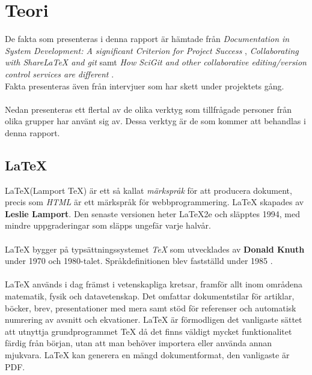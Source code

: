 \section{Teori}
\label{cha:wassing-theory}
De fakta som presenteras i denna rapport är hämtade från \textit{Documentation in System Development: A significant Criterion for Project Success} \cite{docsystemdev}, \textit{Collaborating with ShareLaTeX and git} \cite{website:sharelatex_with_git} samt \textit{How SciGit and other collaborative editing/version control services are different} \cite{website:scigit_blog}. \\
Fakta presenteras även från intervjuer som har skett under projektets gång.
\\ \\
Nedan presenteras ett flertal av de olika verktyg som tillfrågade personer från olika grupper har använt sig av. Dessa verktyg är de som kommer att behandlas i denna rapport.

\subsection{LaTeX}
\LaTeX (Lamport TeX) är ett så kallat \textit{märkspråk} för att producera dokument, precis som \textit{HTML} är ett märkspråk för webbprogrammering. LaTeX skapades av \textbf{Leslie Lamport}. Den senaste versionen heter LaTeX2e och släpptes 1994, med mindre uppgraderingar som släpps ungefär varje halvår.\cite{website:latex_update_release}
\\ \\
LaTeX bygger på typsättningssystemet \textit{TeX} som utvecklades av \textbf{Donald Knuth} under 1970 och 1980-talet. Språkdefinitionen blev fastställd under 1985 \cite{the_tex_book}.
\\ \\
LaTeX används i dag främst i vetenskapliga kretsar, framför allt inom områdena matematik, fysik och datavetenskap. Det omfattar dokumentstilar för artiklar, böcker, brev, presentationer med mera samt stöd för referenser och automatisk numrering av avsnitt och ekvationer. LaTeX är förmodligen det vanligaste sättet att utnyttja grundprogrammet TeX då det finns väldigt mycket funktionalitet färdig från början, utan att man behöver importera eller använda annan mjukvara. LaTeX kan generera en mängd dokumentformat, den vanligaste är PDF.


